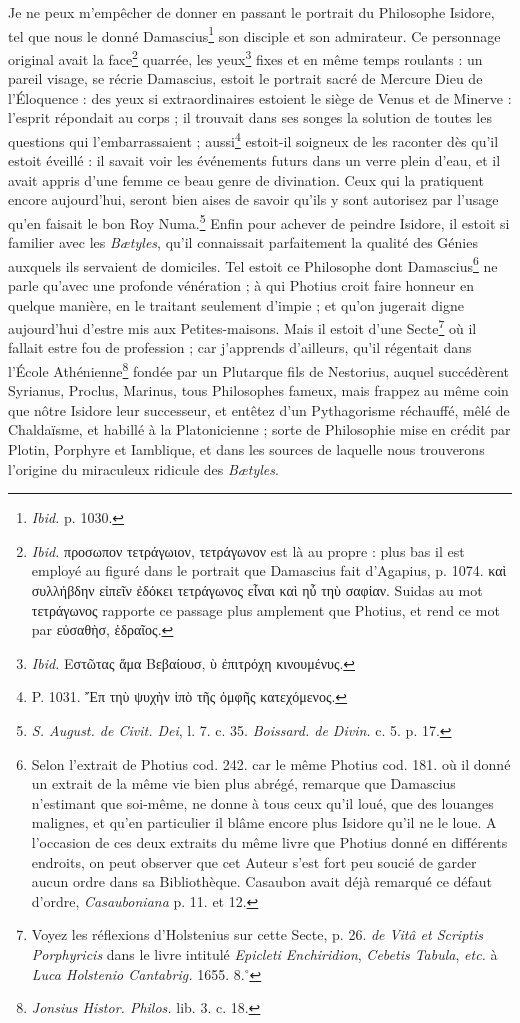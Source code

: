 \documentclass[a4paper, 11pt, oneside, polutonikogreek, french, landscape]{article}
\begin{document}
Je ne peux m'empêcher de donner en passant le portrait du Philosophe Isidore, tel que nous le donné Damascius\footnote{\emph{Ibid.} p. 1030.} son disciple et son admirateur. Ce personnage original avait la face\footnote{\emph{Ibid.} προσωπον τετράγωιον, τετράγωνον est là au propre : plus bas il est employé au figuré dans le portrait que Damascius fait d'Agapius, p. 1074. καὶ συλλήβδην εἰπεῖν ἐδόκει τετράγωνος εἶναι καὶ ηὖ τηὺ σαφἱαν. Suidas au mot τετράγωνος rapporte ce passage plus amplement que Photius, et rend ce mot par εὐσαθὴσ, ἑδραῖος.} quarrée, les yeux\footnote{\emph{Ibid.} Εστῶτας ἅμα Βεβαίουσ, ὺ ἐπιτρόχη κινουμένυς.} fixes et en même temps roulants : un pareil visage, se récrie Damascius, estoit le portrait sacré de Mercure Dieu de l'Éloquence : des yeux si extraordinaires estoient le siège de Venus et de Minerve : l'esprit répondait au corps ; il trouvait dans ses songes la solution de toutes les questions qui l'embarrassaient ; aussi\footnote{P. 1031. Ἔπ τηὺ ψυχὴν ἱπὸ τῆς ὀμφῆς κατεχόμενος.} estoit-il soigneux de les raconter dès qu'il estoit éveillé : il savait voir les événements futurs dans un verre plein d'eau, et il avait appris d'une femme ce beau genre de divination. Ceux qui la pratiquent encore aujourd’hui, seront bien aises de savoir qu'ils y sont autorisez par l'usage qu'en faisait le bon Roy Numa.\footnote{\emph{S. August. de Civit. Dei}, l. 7. c. 35. \emph{Boissard. de Divin.} c. 5. p. 17.} Enfin pour achever de peindre Isidore, il estoit si familier avec les \emph{Bætyles}, qu'il connaissait parfaitement la qualité des Génies auxquels ils servaient de domiciles. Tel estoit ce Philosophe dont Damascius\footnote{Selon l'extrait de Photius cod. 242. car le même Photius cod. 181. où il donné un extrait de la même vie bien plus abrégé, remarque que Damascius n'estimant que soi-même, ne donne à tous ceux qu'il loué, que des louanges malignes, et qu'en particulier il blâme encore plus Isidore qu'il ne le loue. A l'occasion de ces deux extraits du même livre que Photius donné en différents endroits, on peut observer que cet Auteur s'est fort peu soucié de garder aucun ordre dans sa Bibliothèque. Casaubon avait déjà remarqué ce défaut d'ordre, \emph{Casauboniana} p. 11. et 12.} ne parle qu'avec une profonde vénération ; à qui Photius croit faire honneur en quelque manière, en le traitant seulement d'impie ; et qu'on jugerait digne aujourd’hui d'estre mis aux Petites-maisons. Mais il estoit d'une Secte\footnote{Voyez les réflexions d'Holstenius sur cette Secte, p. 26. \emph{de Vitâ et Scriptis Porphyricis} dans le livre intitulé \emph{Epicleti Enchiridion}, \emph{Cebetis Tabula}, \emph{etc.} à \emph{Luca Holstenio Cantabrig.} 1655. 8.$^\circ$} où il fallait estre fou de profession ; car j'apprends d'ailleurs, qu'il régentait dans l'École Athénienne\footnote{\emph{Jonsius Histor. Philos.} lib. 3. c. 18.} fondée par un Plutarque fils de Nestorius, auquel succédèrent Syrianus, Proclus, Marinus, tous Philosophes fameux, mais frappez au même coin que nôtre Isidore leur successeur, et entêtez d'un Pythagorisme réchauffé, mêlé de Chaldaïsme, et habillé à la Platonicienne ; sorte de Philosophie mise en crédit par Plotin, Porphyre et Iamblique, et dans les sources de laquelle nous trouverons l'origine du miraculeux ridicule des \emph{Bætyles}.
\end{document}

